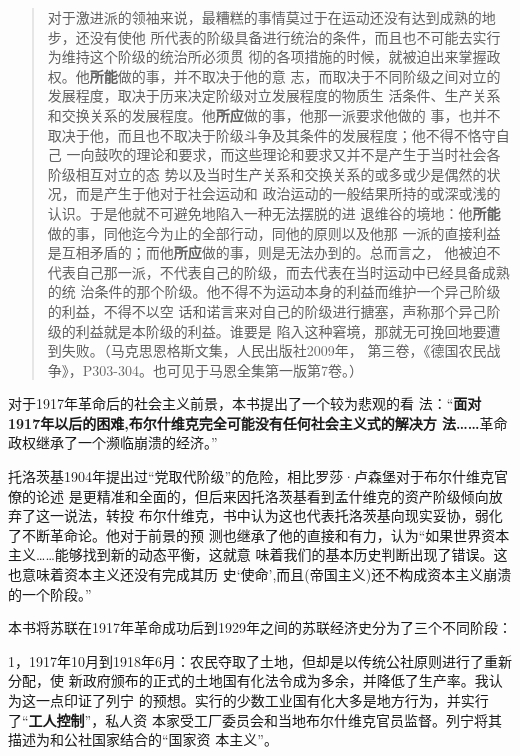 \begin{quotation}
  对于激进派的领袖来说，最糟糕的事情莫过于在运动还没有达到成熟的地步，还没有使他
  所代表的阶级具备进行统治的条件，而且也不可能去实行为维持这个阶级的统治所必须贯
  彻的各项措施的时候，就被迫出来掌握政权。他\textbf{所能}做的事，并不取决于他的意
  志，而取决于不同阶级之间对立的发展程度，取决于历来决定阶级对立发展程度的物质生
  活条件、生产关系和交换关系的发展程度。他\textbf{所应}做的事，他那一派要求他做的
  事，也并不取决于他，而且也不取决于阶级斗争及其条件的发展程度；他不得不恪守自己
  一向鼓吹的理论和要求，而这些理论和要求又并不是产生于当时社会各阶级相互对立的态
  势以及当时生产关系和交换关系的或多或少是偶然的状况，而是产生于他对于社会运动和
  政治运动的一般结果所持的或深或浅的认识。于是他就不可避免地陷入一种无法摆脱的进
  退维谷的境地：他\textbf{所能}做的事，同他迄今为止的全部行动，同他的原则以及他那
  一派的直接利益是互相矛盾的；而他\textbf{所应}做的事，则是无法办到的。总而言之，
  他被迫不代表自己那一派，不代表自己的阶级，而去代表在当时运动中已经具备成熟的统
  治条件的那个阶级。他不得不为运动本身的利益而维护一个异己阶级的利益，不得不以空
  话和诺言来对自己的阶级进行搪塞，声称那个异己阶级的利益就是本阶级的利益。谁要是
  陷入这种窘境，那就无可挽回地要遭到失败。（马克思恩格斯文集，人民出版社2009年，
  第三卷，《德国农民战争》，P303-304。也可见于马恩全集第一版第7卷。）
\end{quotation}

对于1917年革命后的社会主义前景，本书提出了一个较为悲观的看
法：“\textbf{面对1917年以后的困难,布尔什维克完全可能没有任何社会主义式的解决方
  法……}革命政权继承了一个濒临崩溃的经济。”

托洛茨基1904年提出过“党取代阶级”的危险，相比罗莎·卢森堡对于布尔什维克官僚的论述
是更精准和全面的，但后来因托洛茨基看到孟什维克的资产阶级倾向放弃了这一说法，转投
布尔什维克，书中认为这也代表托洛茨基向现实妥协，弱化了不断革命论。他对于前景的预
测也继承了他的直接和有力，认为“如果世界资本主义……能够找到新的动态平衡，这就意
味着我们的基本历史判断出现了错误。这也意味着资本主义还没有完成其历
史‘使命’,而且(帝国主义)还不构成资本主义崩溃的一个阶段。”

本书将苏联在1917年革命成功后到1929年之间的苏联经济史分为了三个不同阶段：

1，1917年10月到1918年6月：农民夺取了土地，但却是以传统公社原则进行了重新分配，使
新政府颁布的正式的土地国有化法令成为多余，并降低了生产率。我认为这一点印证了列宁
的预想。实行的少数工业国有化大多是地方行为，并实行了“\textbf{工人控制}”，私人资
本家受工厂委员会和当地布尔什维克官员监督。列宁将其描述为和公社国家结合的“国家资
本主义”。

